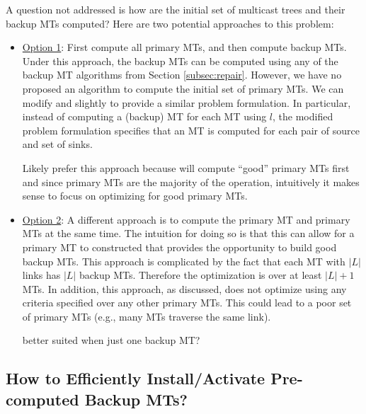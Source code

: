 A question not addressed is how are the initial set of multicast trees and their backup MTs computed?  
Here are two potential approaches to this problem:
\begin{itemize}
	\item \underline{Option 1}: First compute all primary MTs, and then compute backup MTs.  Under this approach, the backup MTs can be computed using any of the backup MT
algorithms from Section \ref{subsec:repair}.  However, we have no proposed an algorithm to compute the initial set of primary MTs. We can modify \mf and \md slightly to provide
a similar problem formulation.  In particular, instead of computing a (backup) MT for each MT using $l$, the modified problem formulation specifies that an MT is computed for each pair of source
and set of sinks. 

Likely prefer this approach because will compute ``good'' primary MTs first and since primary MTs are the majority of the operation, intuitively it makes sense to focus on optimizing
for good primary MTs.

	\item \underline{Option 2}: A different approach is to compute the primary MT and primary MTs at the same time.  The intuition for doing so is that this
can allow for a primary MT to constructed that provides the opportunity to build good backup MTs.  This approach is complicated by the fact that each MT with $|L|$ links has $|L|$ backup
MTs.  Therefore the optimization is over at least $|L|+1$ MTs.  In addition, this approach, as discussed, does not optimize using any criteria specified over any other primary MTs.  
This could lead to a poor set of primary MTs (e.g., many MTs traverse the same link). 

better suited when just one backup MT?
\end{itemize}


\subsection{How to Efficiently Install/Activate Pre-computed Backup MTs?}


